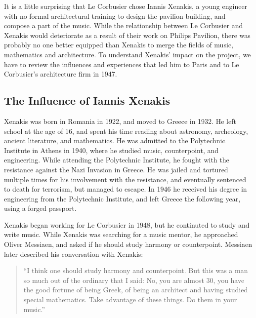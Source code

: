 \documentclass{tufte-book}
\begin{document}
It is a little surprising that Le Corbusier chose Iannis Xenakis, a
young engineer with no formal architectural training to design the
pavilion building, and compose a part of the music. While the
relationship between Le Corbusier and Xenakis would deteriorate as a
result of their work on Philips Pavilion, there was probably no one
better equipped than Xenakis to merge the fields of music, mathematics
and architecture. To understand Xenakis' impact on the project, we
have to review the influences and experiences that led him to Paris
and to Le Corbusier's architecture firm in 1947.

\subsection{The Influence of Iannis Xenakis}
\label{sec:influence-xenakis}

Xenakis was born in Romania in 1922, and moved to Greece in 1932. He
left school at the age of 16, and spent his time reading about
astronomy, archeology, ancient literature, and
mathematics.\cite[]{Hoffmann2015} He was admitted to the
Polytechnic Institute in Athens in 1940, where he studied music,
counterpoint, and engineering. While attending the Polytechnic
Institute, he fought with the resistance against the Nazi Invasion in
Greece. He was jailed and tortured multiple times for his involvement
with the resistance, and eventually sentenced to death for terrorism,
but managed to escape.\cite[]{Simms2014} In 1946 he received his
degree in engineering from the Polytechnic Institute, and left Greece
the following year, using a forged passport.\cite[]{Prendergast2014}

Xenakis began working for Le Corbusier in 1948, but he continuted to
study and write music. While Xenakis was searching for a music mentor,
he approached Oliver Messiaen, and asked if he should study harmony or
counterpoint. Messiaen later described his conversation with
Xenakis:

\begin{quotation}``I think one should study harmony and
  counterpoint. But this was a man so much out of the ordinary that I
  said: No, you are almost 30, you have the good fortune of being
  Greek, of being an architect and having studied special
  mathematics. Take advantage of these things. Do them in your
  music.''\cite{Service2013}
\end{quotation}
\end{document}
